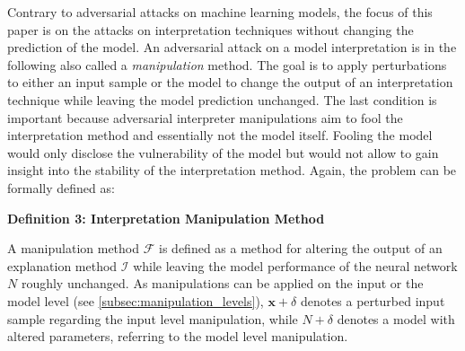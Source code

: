 Contrary to adversarial attacks on machine learning models, the focus of this paper is on the attacks on interpretation techniques without changing the prediction of the model. 
An adversarial attack on a model interpretation is in the following also called a \textit{manipulation} method. 
The goal is to apply perturbations to either an input sample or the model to change the output of an interpretation technique while leaving the model prediction unchanged. The last condition is important because adversarial interpreter manipulations aim to fool the interpretation method and essentially not the model itself. 
Fooling the model would only disclose the vulnerability of the model but would not allow to gain insight into the stability of the interpretation method. 
Again, the problem can be formally defined as:

\par\smallskip
\textbf{Definition 3: Interpretation Manipulation Method} 

\setlength{\leftskip}{0.39cm}
\noindent A manipulation method $\mathcal{F}$ is defined as a method for altering the output of an explanation method $\mathcal{I}$ while leaving the model performance of the neural network $N$ roughly unchanged. 
As manipulations can be applied on the input or the model level (see \autoref{subsec:manipulation_levels}), $\mathbf{x}+\delta$ denotes a perturbed input sample regarding the input level manipulation, while $N+\delta$ denotes a model with altered parameters, referring to the model level manipulation.


